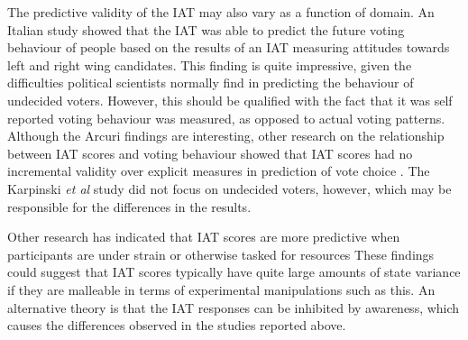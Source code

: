 The predictive validity of the IAT may also vary as a function of domain. An Italian study \cite{Arcuri2008} showed that the IAT was able to predict the future voting behaviour of people based on the results of an IAT measuring attitudes towards left and right wing candidates. This finding is quite impressive, given the difficulties political scientists normally find in predicting the behaviour of undecided voters. However, this should be qualified with the fact that it was self reported voting behaviour was measured, as opposed to actual voting patterns. Although the Arcuri findings are interesting, other research on  the relationship between IAT scores and voting behaviour showed that IAT scores had no incremental validity over explicit measures in prediction of vote choice \cite{Karpinski2005}. The Karpinski \textit{et al } study did not focus on undecided voters, however, which may be responsible for the differences in the results. 


Other research has indicated that IAT scores are more predictive when participants are under strain or otherwise tasked for resources \cite{Hofmann2008a} These findings could suggest that IAT scores typically have quite large amounts of state variance if they are malleable in terms of experimental manipulations such as this. An alternative theory is that the IAT responses can be inhibited by awareness, which causes the differences observed in the studies reported above.  %


